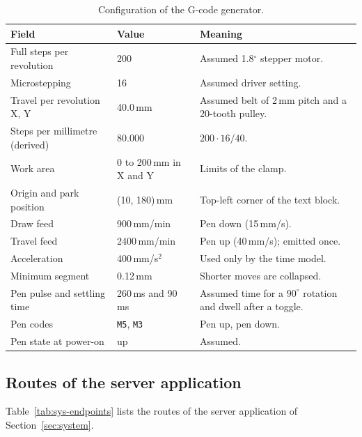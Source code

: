 \begin{table}[h]
\centering
\fontsize{9.5}{11.5}\selectfont
\begin{tabularx}{\linewidth}{|p{4.2cm}|p{2.2cm}|X|}
\hline
\textbf{Field} & \textbf{Value} & \textbf{Meaning} \\
\hline
Full steps per revolution & 200 & Assumed 1.8$^\circ$ stepper motor. \\
\hline
Microstepping & 16 & Assumed driver setting. \\
\hline
Travel per revolution X, Y & 40.0\,mm & Assumed belt of 2\,mm pitch and a 20-tooth pulley. \\
\hline
Steps per millimetre (derived) & 80.000 & $200\cdot16/40$. \\
\hline
Work area & 0 to 200\,mm in X and Y & Limits of the clamp. \\
\hline
Origin and park position & (10, 180)\,mm & Top-left corner of the text block. \\
\hline
Draw feed & 900\,mm/min & Pen down (15\,mm/s). \\
\hline
Travel feed & 2400\,mm/min & Pen up (40\,mm/s); emitted once. \\
\hline
Acceleration & 400\,mm/s$^2$ & Used only by the time model. \\
\hline
Minimum segment & 0.12\,mm & Shorter moves are collapsed. \\
\hline
Pen pulse and settling time & 260\,ms and 90\,ms & Assumed time for a $90^\circ$ rotation and dwell after a toggle. \\
\hline
Pen codes & \texttt{M5}, \texttt{M3} & Pen up, pen down. \\
\hline
Pen state at power-on & up & Assumed. \\
\hline
\end{tabularx}
\caption{Configuration of the G-code generator.}
\label{tab:gc-config}
\end{table}

\subsection{Routes of the server application}

Table~\ref{tab:sys-endpoints} lists the routes of the server application of Section~\ref{sec:system}.

